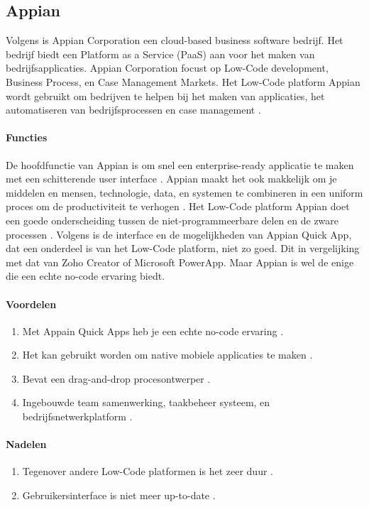 \subsection{Appian}%
\label{subsec:appian}
Volgens \textcite{Shala} is Appian Corporation een cloud-based business software bedrijf. Het bedrijf biedt een Platform as a Service (PaaS) aan voor het maken van bedrijfsapplicaties.
Appian Corporation focust op Low-Code development, Business Process, en Case Management Markets. Het Low-Code platform Appian wordt gebruikt om bedrijven te helpen
bij het maken van applicaties, het automatiseren van bedrijfsprocessen en case management \autocite{Shala}.
\paragraph{Functies}
De hoofdfunctie van Appian is om snel een enterprise-ready applicatie te maken met een schitterende user interface \autocite{Shala}. Appian maakt het ook makkelijk 
om je middelen en mensen, technologie, data, en systemen te combineren in een uniform proces om de productiviteit te verhogen \autocite{Shala}.
Het Low-Code platform Appian doet een goede onderscheiding tussen de niet-programmeerbare delen en de zware processen \autocite{Marvin2017}.
Volgens \textcite{Marvin2017} is de interface en de mogelijkheden van Appian Quick App, dat een onderdeel is van het Low-Code platform, niet zo goed. Dit in vergelijking met dat van Zoho Creator of Microsoft PowerApp. Maar Appian is wel de enige die een echte no-code ervaring biedt.

\paragraph*{Voordelen}
\begin{enumerate}
    \item Met Appain Quick Apps heb je een echte no-code ervaring \autocite{Marvin2017}.
    \item Het kan gebruikt worden om native mobiele applicaties te maken \autocite{Marvin2017}.
    \item Bevat een drag-and-drop procesontwerper \autocite{Marvin2017}.
    \item Ingebouwde team samenwerking, taakbeheer systeem, en bedrijfsnetwerkplatform \autocite{Marvin2017}.
\end{enumerate}


\paragraph*{Nadelen}
\begin{enumerate}
    \item Tegenover andere Low-Code platformen is het zeer duur \autocite{Marvin2017}.
    \item Gebruikersinterface is niet meer up-to-date \autocite{Marvin2017}.
\end{enumerate}


